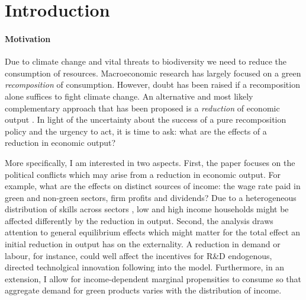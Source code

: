 \section{Introduction}

\paragraph{Motivation}%
Due to climate change and vital threats to biodiversity we need to reduce the consumption of resources. %
Macroeconomic research has largely focused on a green \textit{recomposition} of consumption. However, doubt has been raised if a recomposition alone suffices to fight climate change. An alternative and most likely complementary approach that has been proposed is a \textit{reduction} of economic output \citep[e.g.][]{Dasgupta2021, GoughCANGREEN, Naqvi2017FiftyPollutants}. %
In light of the uncertainty about the success of a pure recomposition policy and the urgency to act, it is time to ask: what are the effects of a reduction in economic output? 


More specifically, I am interested in two aspects. First, the paper focuses on the political conflicts which may arise from a reduction in economic output. 
For example, what are the effects on distinct sources of income: the wage rate paid in green and non-green sectors, firm profits and dividends?  Due to a heterogeneous distribution of skills across sectors \cite{Bowen2018CharacterisingComposition, Consoli2016DoCapital}, low and high income households might be affected differently by the reduction in output. 
Second, the analysis draws attention to general equilibrium effects which might matter for the total effect an initial reduction in output has on the externality. 
A reduction in demand or labour, for instance, could well affect the incentives for R\&D  endogenous, directed technolgical innovation following  \cite{Acemoglu2012TheChange} into the model. Furthermore, in an extension, I allow for income-dependent marginal propensities to consume so that aggregate demand for green products varies with the distribution of income. 


